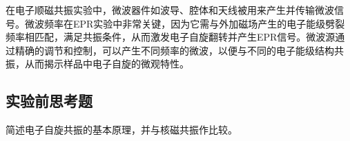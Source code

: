 \documentclass[dvipsnames, svgnames,a4paper,11pt]{article}
\begin{document}
\begin{enumerate}
		
		在电子顺磁共振实验中，微波器件如波导、腔体和天线被用来产生并传输微波信号。微波频率在EPR实验中非常关键，因为它需与外加磁场产生的电子能级劈裂频率相匹配，满足共振条件，从而激发电子自旋翻转并产生EPR信号。微波源通过精确的调节和控制，可以产生不同频率的微波，以便与不同的电子能级结构共振，从而揭示样品中电子自旋的微观特性。
	\end{enumerate}



\clearpage
\subsection{实验前思考题}

\begin{question}
	简述电子自旋共振的基本原理，并与核磁共振作比较。
\end{question}


\end{document}
